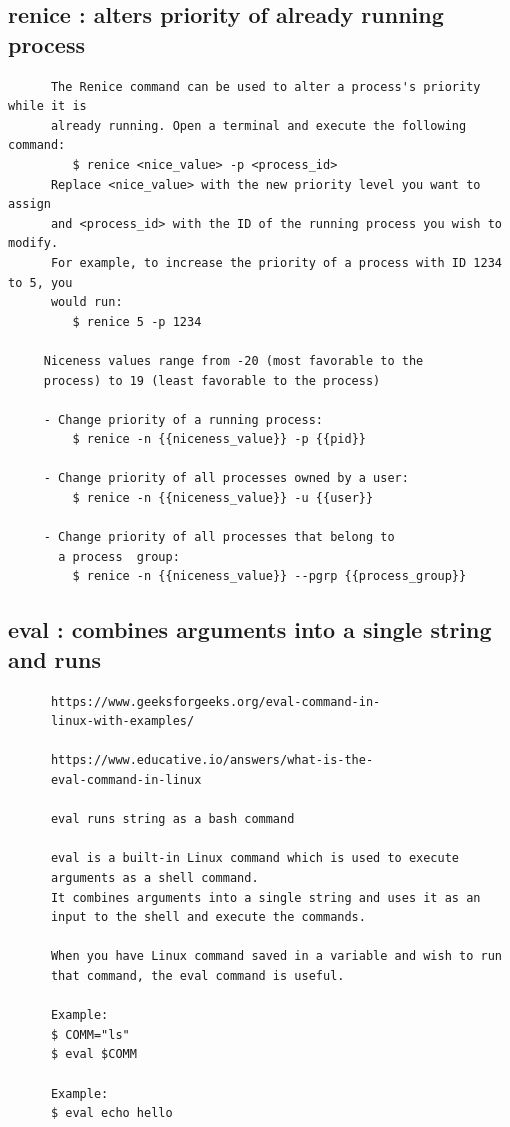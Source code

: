 \documentclass[a4paper,12pt]{article}
\begin{document}
\subsection{renice   : alters priority of already running process }
\begin{verbatim}
      The Renice command can be used to alter a process's priority while it is     
      already running. Open a terminal and execute the following command:
         $ renice <nice_value> -p <process_id>
      Replace <nice_value> with the new priority level you want to assign    
      and <process_id> with the ID of the running process you wish to modify.
      For example, to increase the priority of a process with ID 1234 to 5, you 
      would run:
         $ renice 5 -p 1234

     Niceness values range from -20 (most favorable to the  
     process) to 19 (least favorable to the process)

     - Change priority of a running process:
         $ renice -n {{niceness_value}} -p {{pid}}

     - Change priority of all processes owned by a user:
         $ renice -n {{niceness_value}} -u {{user}}

     - Change priority of all processes that belong to 
       a process  group:
         $ renice -n {{niceness_value}} --pgrp {{process_group}}
\end{verbatim}

\subsection{eval : combines arguments into a single string and runs }
\begin{verbatim}
      https://www.geeksforgeeks.org/eval-command-in-
      linux-with-examples/
      
      https://www.educative.io/answers/what-is-the-
      eval-command-in-linux
      
      eval runs string as a bash command
      
      eval is a built-in Linux command which is used to execute 
      arguments as a shell command. 
      It combines arguments into a single string and uses it as an 
      input to the shell and execute the commands. 
      
      When you have Linux command saved in a variable and wish to run 
      that command, the eval command is useful. 
      
      Example:
      $ COMM="ls"
      $ eval $COMM
      
      Example:
      $ eval echo hello
      
\end{verbatim}
\end{document}
